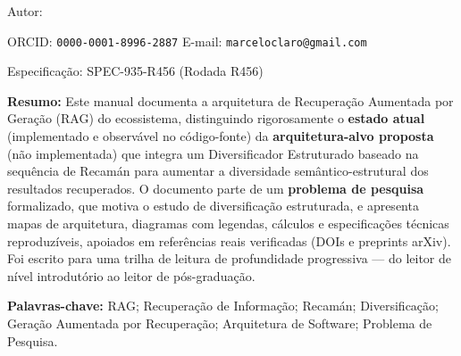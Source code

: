 
\imprimircapa

\newpage
\begin{center}
{\large\imprimirtitulo}
\end{center}
\vspace{1cm}
\begin{center}
{\large Autor: \imprimirautor}
\end{center}
\vspace{0.2cm}
\begin{center}
{\small ORCID: \texttt{0000-0001-8996-2887} \quad E-mail: \texttt{marceloclaro@gmail.com}}
\end{center}
\vspace{0.5cm}
\begin{center}
{\normalsize Especificação: SPEC-935-R456 (Rodada R456)}
\end{center}
\vspace{1cm}

\textbf{Resumo:} Este manual documenta a arquitetura de Recuperação Aumentada por
Geração (RAG) do ecossistema, distinguindo rigorosamente o \textbf{estado atual}
(implementado e observável no código-fonte) da \textbf{arquitetura-alvo proposta}
(não implementada) que integra um Diversificador Estruturado baseado na sequência
de Recamán para aumentar a diversidade semântico-estrutural dos resultados
recuperados. O documento parte de um \textbf{problema de pesquisa} formalizado,
que motiva o estudo de diversificação estruturada, e apresenta mapas de
arquitetura, diagramas com legendas, cálculos e especificações técnicas
reproduzíveis, apoiados em referências reais verificadas (DOIs e preprints arXiv).
Foi escrito para uma trilha de leitura de profundidade progressiva --- do leitor
de nível introdutório ao leitor de pós-graduação.

\vspace{0.5cm}
\textbf{Palavras-chave:} RAG; Recuperação de Informação; Recamán; Diversificação;
Geração Aumentada por Recuperação; Arquitetura de Software; Problema de Pesquisa.

\newpage

\tableofcontents*
\clearpage

\listoffigures*
\clearpage
{}
\listoftables*
\clearpage
